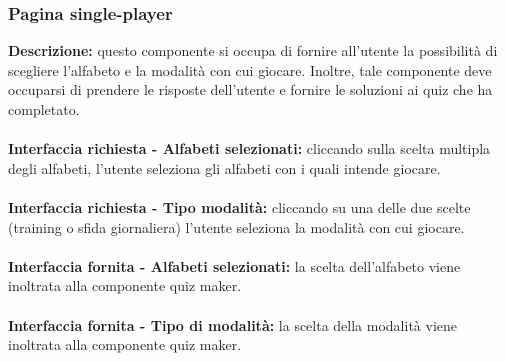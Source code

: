 
\subsubsection{Pagina single-player}
\textbf{Descrizione:} questo componente si occupa di fornire all'utente la possibilità di scegliere l'alfabeto e la modalità con cui giocare. Inoltre, tale componente deve occuparsi di prendere le risposte dell'utente e fornire le soluzioni ai quiz che ha completato.\\
\\
\textbf{Interfaccia richiesta - Alfabeti selezionati:} cliccando sulla scelta multipla degli alfabeti, l'utente seleziona gli alfabeti con i quali intende giocare.\\
\\
\textbf{Interfaccia richiesta - Tipo modalità:} cliccando su una delle due scelte (training o sfida giornaliera) l'utente seleziona la modalità con cui giocare.\\
\\
\textbf{Interfaccia fornita - Alfabeti selezionati: }la scelta dell'alfabeto viene inoltrata alla componente quiz maker.\\
\\
\textbf{Interfaccia fornita - Tipo di modalità: }la scelta della modalità viene inoltrata alla componente quiz maker.

